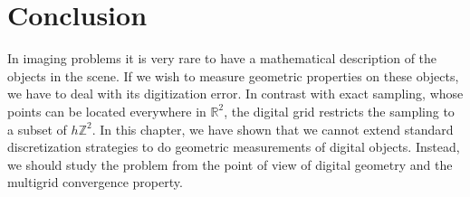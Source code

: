 \section{Conclusion}

In imaging problems it is very rare to have a mathematical description of the objects in the scene. If we wish to measure geometric properties on these objects, we have to deal with its digitization error. In contrast with exact sampling, whose points can be located everywhere in $\mathbb{R}^2$, the digital grid restricts the sampling to a subset of $h\mathbb{Z}^2$. In this chapter, we have shown that we cannot extend standard discretization strategies to do geometric measurements of digital objects. Instead, we should study the problem from the point of view of digital geometry and the multigrid convergence property.



